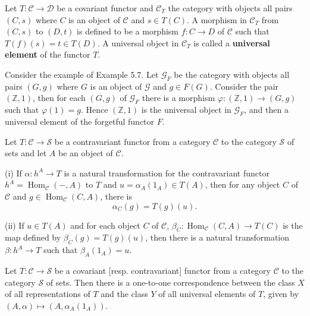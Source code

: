 \documentclass{article}
\DeclareMathOperator{\Hom}{Hom}
\begin{document}
\begin{example}
    
\end{example}

\begin{definition}
    Let $T:\mathscr{C}\to \mathscr{D}$ be a covariant functor and $\mathscr{C}_T$ the category with objects all pairs $(C,s)$ where $C$ is an object of $\mathscr{C}$ and $s \in T(C)$. A morphism in $\mathscr{C}_T$ from $(C,s)$ to $(D,t)$ is defined to be a morphism $f:C\to D$ of $\mathscr{C}$ such that $T(f)(s)=t \in T(D)$. A universal object in $\mathscr{C}_T$ is called a \textbf{universal element} of the functor $T$.
\end{definition}

\begin{example}
    Consider the example of Example 5.7. Let $\mathscr{G}_F$ be the category with objects all pairs $(G,g)$ where $G$ is an object of $\mathscr{G}$ and $g \in F(G)$. Consider the pair $(\mathbb{Z},1)$, then for each $(G,g)$ of $\mathscr{G}_F$ there is a morphism $\varphi:(\mathbb{Z},1)\to (G,g)$ such that $\varphi(1)=g$. Hence $(\mathbb{Z},1)$ is the universal object in $\mathscr{G}_F$, and then a universal element of the forgetful functor $F$.
\end{example}

\begin{lemma}
    Let $T:\mathscr{C}\to \mathscr{S}$ be a contravariant functor from a category $\mathscr{C}$ to the category $\mathscr{S}$ of sets and let $A$ be an object of $\mathscr{C}$.

    (i) If $\alpha:h^A\to T$ is a natural transformation for the contravariant functor $h^A=\Hom_{\mathscr{C}}(-,A)$ to $T$ and $u=\alpha_A(1_A) \in T(A)$, then for any object $C$ of $\mathscr{C}$ and $g \in \Hom_{\mathscr{C}}(C,A)$, there is $$\alpha_C(g)=T(g)(u).$$

    (ii) If $u \in T(A)$ and for each object $C$ of $\mathscr{C}$, $\beta_C:\Hom_{\mathscr{C}}(C,A)\to T(C)$ is the map defined by $\beta_C(g)= T(g)(u)$, then there is a natural transformation $\beta:h^A\to T$ such that $\beta_A(1_A)=u$.
\end{lemma}

\begin{theorem}
    Let $T:\mathscr{C}\to \mathscr{S}$ be a covariant [resp. contravariant] functor from a category $\mathscr{C}$ to the category $\mathscr{S}$ of sets. Then there is a one-to-one correspondence between the class $X$ of all representations of $T$ and the class $Y$ of all universal elements of $T$, given by $(A,\alpha)\mapsto (A,\alpha_A(1_A))$. 
\end{theorem}
\end{document}
